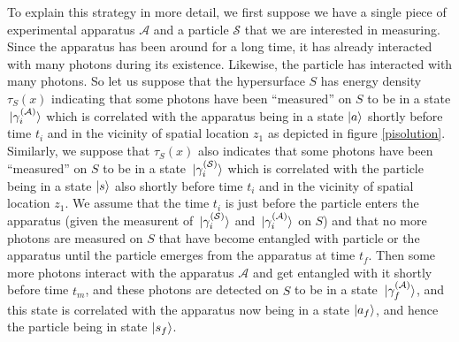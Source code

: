 To explain this strategy in more detail, we first suppose we have a single piece of experimental apparatus $\mathcal{A}$ and a particle $\mathcal{S}$ that we are interested in measuring. Since the apparatus has been around for a long time, it has already interacted with many photons during its existence. Likewise, the particle has interacted with many photons. So let us suppose that the hypersurface $S$ has energy density $\tau_S(x)$ indicating that some photons have been ``measured'' on $S$ to be in a state $\ket*{\gamma_i^{(\mathcal{A})}}$ which is correlated with the apparatus being in a state $\ket{a}$ shortly before time $t_i$ and in the vicinity of spatial location $z_1$ as depicted in figure \ref{pisolution}. Similarly, we suppose that $\tau_S(x)$ also indicates that some photons have been ``measured'' on $S$ to be in a state $\ket*{\gamma_i^{(\mathcal{S})}}$ which is correlated with the particle being in a state $\ket{s}$ also shortly before time $t_i$ and in the vicinity of spatial location $z_1$. We assume that the time $t_i$ is just before the particle enters the apparatus (given the measurent of $\ket*{\gamma_i^{(\mathcal{S})}}$ and  $\ket*{\gamma_i^{(\mathcal{A})}}$ on $S$) and that no more photons are measured on $S$ that have become entangled with particle  or the apparatus until the particle emerges from the apparatus at time $t_f$. Then some more photons interact with the apparatus $\mathcal{A}$ and get entangled with it shortly before time $t_m$, and these photons are detected on $S$ to be in a state  $\ket*{\gamma_f^{(\mathcal{A})}}$, and this state is correlated with the apparatus now being in a state $\ket{a_{f}}$, and hence the particle being in state $\ket{s_f}$. 

